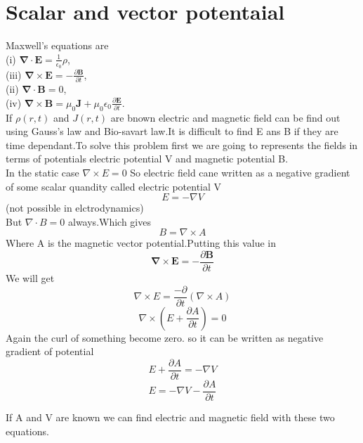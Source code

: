 \section{Scalar and vector potentaial}
Maxwell's equations are\\
(i) $\boldsymbol{\nabla} \cdot \mathbf{E}=\frac{1}{\epsilon_{0}} \rho$,\\
(iii) $\boldsymbol{\nabla} \times \mathbf{E}=-\frac{\partial \mathbf{B}}{\partial t}$,\\
(ii) $\boldsymbol{\nabla} \cdot \mathbf{B}=0$,\\
(iv) $\boldsymbol{\nabla} \times \mathbf{B}=\mu_{0} \mathbf{J}+\mu_{0} \epsilon_{0} \frac{\partial \mathbf{E}}{\partial t}$.\\
If $\rho(r,t)$ and $J(r,t)$ are bnown electric and magnetic field can be find out using Gauss's law and Bio-savart law.It is difficult to find E ans B if they are time dependant.To solve this problem first we are going to represents the fields in terms of potentials electric potential V and magnetic potential B.\\
In the static case $\nabla \times E=0$ So electric field cane written as a negative gradient of some scalar quandity called electric potential V\\
$$E=-\nabla V$$(not possible in elctrodynamics)\\
But $\nabla \cdot B=0$ always.Which gives \\
$$B=\nabla\times A$$
 Where A is the magnetic vector potential.Putting this value in 
$$\boldsymbol{\nabla} \times \mathbf{E}=-\frac{\partial \mathbf{B}}{\partial t}$$
We will get \\
$$\nabla \times E=\frac{-\partial }{\partial t}(\nabla \times A)$$
$$\nabla \times \left( E+\frac{\partial A}{\partial t}\right) =0$$
Again the curl of something become zero. so it can be written as negative gradient of potential
$$E+\frac{\partial A}{\partial t}=-\nabla V$$
$$E=-\nabla V-\frac{\partial A}{\partial t}$$
\begin{center}
\end{center}
If A and V are known we can find electric and magnetic field with these two equations.

